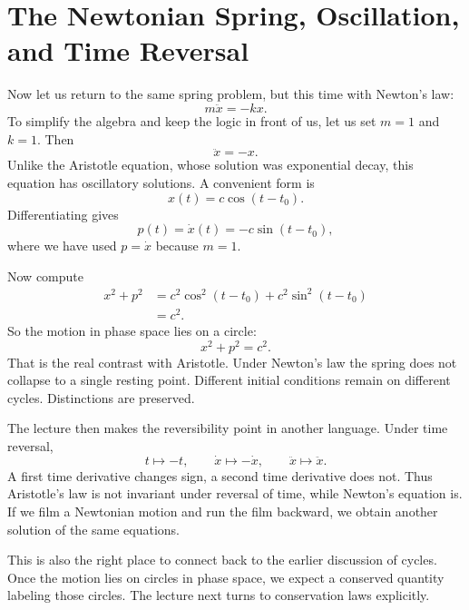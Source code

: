 \section{The Newtonian Spring, Oscillation, and Time Reversal}

Now let us return to the same spring problem, but this time with Newton's law:
\begin{equation}
m\ddot x=-kx.
\end{equation}
To simplify the algebra and keep the logic in front of us, let us set \(m=1\) and \(k=1\). Then
\begin{equation}
\ddot x=-x.
\end{equation}
Unlike the Aristotle equation, whose solution was exponential decay, this equation has oscillatory solutions. A convenient form is
\begin{equation}
x(t)=c\cos(t-t_0).
\end{equation}
Differentiating gives
\begin{equation}
p(t)=\dot x(t)=-c\sin(t-t_0),
\end{equation}
where we have used \(p=\dot x\) because \(m=1\).

Now compute
\begin{align}
x^2+p^2
&=c^2\cos^2(t-t_0)+c^2\sin^2(t-t_0)\\
&=c^2.
\end{align}
So the motion in phase space lies on a circle:
\begin{equation}
x^2+p^2=c^2.
\end{equation}
That is the real contrast with Aristotle. Under Newton's law the spring does not collapse to a single resting point. Different initial conditions remain on different cycles. Distinctions are preserved.

The lecture then makes the reversibility point in another language. Under time reversal,
\begin{equation}
t\mapsto -t,\qquad \dot x\mapsto -\dot x,\qquad \ddot x\mapsto \ddot x.
\end{equation}
A first time derivative changes sign, a second time derivative does not. Thus Aristotle's law is not invariant under reversal of time, while Newton's equation is. If we film a Newtonian motion and run the film backward, we obtain another solution of the same equations.

This is also the right place to connect back to the earlier discussion of cycles. Once the motion lies on circles in phase space, we expect a conserved quantity labeling those circles. The lecture next turns to conservation laws explicitly.

